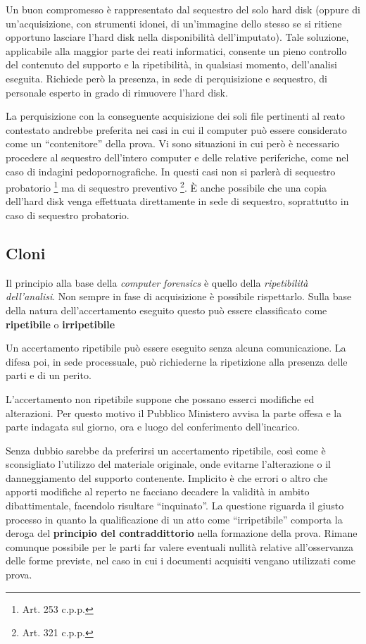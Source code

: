 Un buon compromesso è rappresentato dal sequestro del solo hard disk (oppure di un'acquisizione, con strumenti idonei, di un'immagine dello stesso se si ritiene opportuno lasciare l'hard disk nella disponibilità dell'imputato).
Tale soluzione, applicabile alla maggior parte dei reati informatici, consente un pieno controllo del contenuto del supporto e la ripetibilità, in qualsiasi momento, dell'analisi eseguita. Richiede però la presenza, in sede di perquisizione e sequestro, di personale esperto in grado di rimuovere l'hard disk.

La perquisizione con la conseguente acquisizione dei soli file pertinenti al reato contestato andrebbe preferita nei casi in cui il computer può essere considerato come un ``contenitore'' della prova. Vi sono situazioni in cui però è necessario procedere al sequestro dell'intero computer e delle relative periferiche, come nel caso di indagini pedopornografiche. In questi casi non si parlerà di sequestro probatorio \footnote{Art. 253 c.p.p.} ma di sequestro preventivo \footnote{Art. 321 c.p.p.}. \`E anche possibile che una copia dell'hard disk venga effettuata direttamente in sede di sequestro, soprattutto in caso di sequestro probatorio. 
 
\subsection{Cloni}

Il principio alla base della \textit{computer forensics} è quello della \textit{ripetibilità dell'analisi}. Non sempre in fase di acquisizione è possibile rispettarlo. Sulla base della natura dell'accertamento eseguito questo può essere classificato come \textbf{ripetibile} o \textbf{irripetibile} 

Un accertamento ripetibile può essere eseguito senza alcuna comunicazione. La difesa poi, in sede processuale, può richiederne la ripetizione alla presenza delle parti e di un perito. 

L'accertamento non ripetibile suppone che possano esserci modifiche ed alterazioni. Per questo motivo il Pubblico Ministero avvisa la parte offesa e la parte indagata sul giorno, ora e luogo del conferimento dell'incarico.

Senza dubbio sarebbe da preferirsi un accertamento ripetibile, così come è sconsigliato l'utilizzo del materiale originale, onde evitarne l'alterazione o il danneggiamento del supporto contenente. 
Implicito è che errori o altro che apporti modifiche al reperto ne facciano decadere la validità in ambito dibattimentale, facendolo risultare ``inquinato''. La questione riguarda il giusto processo in quanto la qualificazione di un atto come ``irripetibile'' comporta la deroga del \textbf{principio del contraddittorio} nella formazione della prova. Rimane comunque possibile per le parti far valere eventuali nullità relative all'osservanza delle forme previste, nel caso in cui i documenti acquisiti vengano utilizzati come prova.

